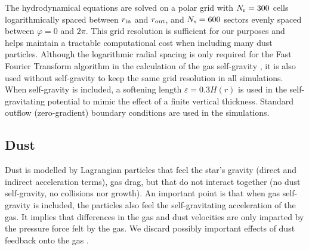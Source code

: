 \documentclass[a4paper,usenatbib]{mnras}
\begin{document}
The hydrodynamical equations are solved on a polar grid with $N_{\rm
  r} = 300$ cells logarithmically spaced between $r_{\rm in}$ and
$r_{\rm out}$, and $N_{\rm s} = 600$ sectors evenly spaced between
$\varphi=0$ and $2\pi$. This grid resolution is sufficient for our
purposes and helps maintain a tractable computational cost when
including many dust particles.  Although the logarithmic radial
spacing is only required for the Fast Fourier Transform algorithm in
the calculation of the gas self-gravity \citep{BM08b}, it is also used
without self-gravity to keep the same grid resolution in all
simulations. When self-gravity is included, a softening length
$\varepsilon = 0.3H(r)$ is used in the self-gravitating potential to
mimic the effect of a finite vertical thickness. Standard outflow
(zero-gradient) boundary conditions are used in the simulations.


\subsection{Dust}
\label{sec:model_pc}
Dust is modelled by Lagrangian particles that feel the star's gravity
(direct and indirect acceleration terms), gas drag, but that do not
interact together (no dust self-gravity, no collisions nor growth). An
important point is that when gas self-gravity is included, the
particles also feel the self-gravitating acceleration of the gas. It
implies that differences in the gas and dust velocities are only
imparted by the pressure force felt by the gas.  We discard possibly
important effects of dust feedback onto the gas
\citep[e.g.,][]{CZS15}.
\end{document}
